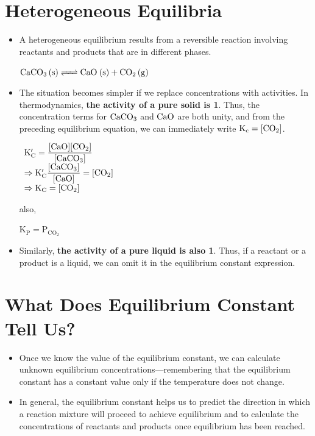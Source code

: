 \documentclass[a4paper,12pt,twocolumn]{article}
\begin{document}
\section{Heterogeneous Equilibria}
\begin{itemize}
    \item A heterogeneous equilibrium results from a reversible reaction involving reactants and products that are in different phases.
          \begin{center}
            $\ce{CaCO3 (s) <=> CaO (s) + CO2 (g)}$
          \end{center}
    \item The situation becomes simpler if we replace concentrations with activities. In thermodynamics, \textbf{the activity of a pure solid is 1}. Thus, the concentration terms for $\ce{CaCO3}$ and $\ce{CaO}$ are both unity, and from the preceding equilibrium equation, we can immediately write $\mathrm{K_c} = [\ce{CO2}]$. \\
          \begin{center}
            $\begin{array}{l}
                \mathrm{K^{\prime}_C} = \dfrac{[\ce{CaO}][\ce{CO2}]}{[\ce{CaCO3}]}              \\
                \Rightarrow \mathrm{K^{\prime}_C} \dfrac{[\ce{CaCO3}]}{[\ce{CaO}]} = [\ce{CO2}] \\
                \Rightarrow \mathrm{K_C} = [\ce{CO2}]                                           
            \end{array}$
          \end{center}
          also,
          \begin{center}
            $\mathrm{K_P = P_{CO_2}}$
          \end{center}
    \item Similarly, \textbf{the activity of a pure liquid is also 1}. Thus, if a reactant or a product is a liquid, we can omit it in the equilibrium constant expression.
\end{itemize}

\section{What Does Equilibrium Constant Tell Us?}
\begin{itemize}
    \item Once we know the value of the equilibrium constant, we can calculate unknown equilibrium concentrations—remembering that the equilibrium constant has a constant value only if the temperature does not change. 
    \item In general, the equilibrium constant helps us to predict the direction in which a reaction mixture will proceed to achieve equilibrium and to calculate the concentrations of reactants and products once equilibrium has been reached. 
\end{itemize}
\end{document}
